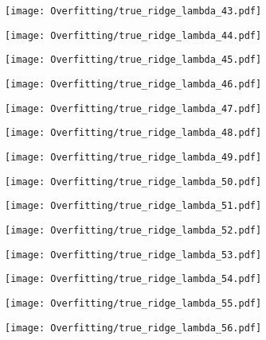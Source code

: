 \documentclass[xcolor=pdftex,dvipsnames,table]{beamer}
\begin{document}
\frame
{
	\begin{center}
		\texttt{[image: Overfitting/true\_ridge\_lambda\_43.pdf]}
	\end{center}
}
\frame
{
	\begin{center}
		\texttt{[image: Overfitting/true\_ridge\_lambda\_44.pdf]}
	\end{center}
}
\frame
{
	\begin{center}
		\texttt{[image: Overfitting/true\_ridge\_lambda\_45.pdf]}
	\end{center}
}
\frame
{
	\begin{center}
		\texttt{[image: Overfitting/true\_ridge\_lambda\_46.pdf]}
	\end{center}
}
\frame
{
	\begin{center}
		\texttt{[image: Overfitting/true\_ridge\_lambda\_47.pdf]}
	\end{center}
}
\frame
{
	\begin{center}
		\texttt{[image: Overfitting/true\_ridge\_lambda\_48.pdf]}
	\end{center}
}
\frame
{
	\begin{center}
		\texttt{[image: Overfitting/true\_ridge\_lambda\_49.pdf]}
	\end{center}
}
\frame
{
	\begin{center}
		\texttt{[image: Overfitting/true\_ridge\_lambda\_50.pdf]}
	\end{center}
}
\frame
{
	\begin{center}
		\texttt{[image: Overfitting/true\_ridge\_lambda\_51.pdf]}
	\end{center}
}
\frame
{
	\begin{center}
		\texttt{[image: Overfitting/true\_ridge\_lambda\_52.pdf]}
	\end{center}
}
\frame
{
	\begin{center}
		\texttt{[image: Overfitting/true\_ridge\_lambda\_53.pdf]}
	\end{center}
}
\frame
{
	\begin{center}
		\texttt{[image: Overfitting/true\_ridge\_lambda\_54.pdf]}
	\end{center}
}
\frame
{
	\begin{center}
		\texttt{[image: Overfitting/true\_ridge\_lambda\_55.pdf]}
	\end{center}
}
\frame
{
	\begin{center}
		\texttt{[image: Overfitting/true\_ridge\_lambda\_56.pdf]}
	\end{center}
}
\end{document}
